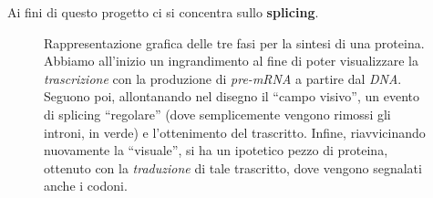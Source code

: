 \documentclass[a4paper,12pt, oneside]{book}
\begin{document}
Ai fini di questo progetto ci si concentra sullo \textbf{splicing}.\\
\begin{figure}
  \centering
  
  \caption{Rappresentazione grafica delle tre fasi per la sintesi di una
    proteina. Abbiamo all'inizio un ingrandimento al fine di poter visualizzare
    la \textit{trascrizione} con la produzione di 
    \textit{pre-mRNA} a partire dal \textit{DNA}. Seguono poi, allontanando nel
    disegno il ``campo visivo'', un evento di splicing ``regolare''
    (dove semplicemente vengono rimossi gli introni, in verde) e l'ottenimento
    del trascritto. Infine, riavvicinando nuovamente la ``visuale'', si ha un
    ipotetico pezzo di proteina, ottenuto con la \textit{traduzione} di tale
    trascritto, dove vengono segnalati anche i codoni.}    
  \label{prot}
\end{figure}
\end{document}
